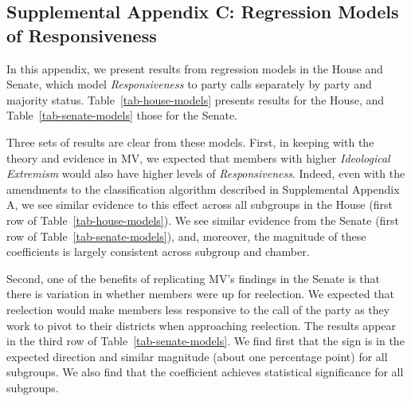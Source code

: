 \documentclass[12pt]{article}
\begin{document}
\clearpage

\subsection*{Supplemental Appendix C: Regression Models of Responsiveness}
%

In this appendix, we present results from regression models in the House and Senate, which model \textit{Responsiveness} to party calls separately by party and majority status.
Table~\ref{tab-house-models} presents results for the House, and Table~\ref{tab-senate-models} those for the Senate.

Three sets of results are clear from these models. First, in keeping with the theory and evidence in MV, we expected that members with higher \textit{Ideological Extremism} would also have higher levels of \textit{Responsiveness}.  Indeed, even with the amendments to the classification algorithm described in Supplemental Appendix A, we see similar evidence to this effect across all subgroups in the House (first row of Table~\ref{tab-house-models}).  We see similar evidence from the Senate (first row of Table~\ref{tab-senate-models}), and, moreover, the magnitude of these coefficients is largely consistent across subgroup and chamber.

Second, one of the benefits of replicating MV's findings in the Senate is that there is variation in whether members were up for reelection.  We expected that reelection would make members less responsive to the call of the party as they work to pivot to their districts when approaching reelection.  The results appear in the third row of Table~\ref{tab-senate-models}.  We find first that the sign is in the expected direction and similar magnitude (about one percentage point) for all subgroups.  We also find that the coefficient achieves statistical significance for all subgroups.
\end{document}
